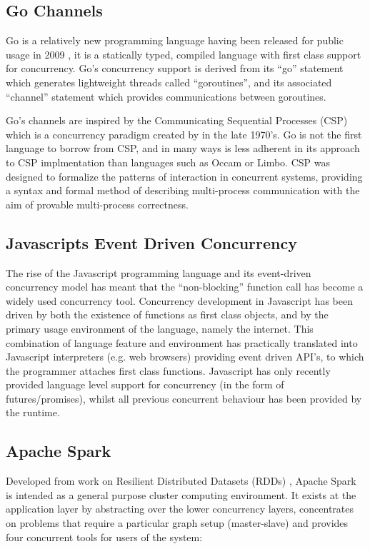 \documentclass{sig-alternate}
\begin{document}
\subsection{Go Channels}
Go is a relatively new programming language having been released for public usage in 2009 \cite{go:_frequen_asked_quest}, it is a statically typed, compiled language with first class support for concurrency. Go's concurrency support is derived from its ``go'' statement which generates lightweight threads called ``goroutines'', and its associated ``channel'' statement which provides communications between goroutines.

Go's channels are inspired by the Communicating Sequential Processes (CSP) which is a concurrency paradigm created by \cite{Hoare:1978:CSP:359576.359585} in the late 1970's. Go is not the first language to borrow from CSP, and in many ways is less adherent in its approach to CSP implmentation than languages such as Occam or Limbo. CSP was designed to formalize the patterns of interaction in concurrent systems, providing a syntax and formal method of describing multi-process communication with the aim of provable multi-process correctness.

\subsection{Javascripts Event Driven Concurrency}
The rise of the Javascript programming language and its event-driven concurrency model has meant that the ``non-blocking'' function call has become a widely used concurrency tool. Concurrency development in Javascript has been driven by both the existence of functions as first class objects, and by the primary usage environment of the language, namely the internet. This combination of language feature and environment has practically translated into Javascript interpreters (e.g. web browsers) providing event driven API's, to which the programmer attaches first class functions. Javascript has only recently provided language level support for concurrency (in the form of futures/promises), whilst all previous concurrent behaviour has been provided by the runtime.

\subsection{Apache Spark}
Developed from work on Resilient Distributed Datasets (RDDs)  \cite{zaharia14:_archit_fast_gener_data_proces_large_clust},  Apache Spark is intended as a general purpose cluster computing environment. It exists at the application layer by abstracting over the lower concurrency layers, concentrates on problems that require a particular graph setup (master-slave) and provides four concurrent tools for users of the system:
\end{document}
